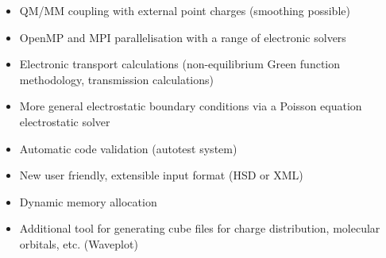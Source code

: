 \begin{itemize}
\item QM/MM coupling with external point charges (smoothing possible)
\item OpenMP and MPI parallelisation with a range of electronic solvers
\item Electronic transport calculations (non-equilibrium Green function
  methodology, transmission calculations)
\item More general electrostatic boundary conditions via a Poisson equation
  electrostatic solver
\item Automatic code validation (autotest system)
\item New user friendly, extensible input format (HSD or XML)
\item Dynamic memory allocation
\item Additional tool for generating cube files for charge distribution,
  molecular orbitals, etc. (Waveplot)
\end{itemize}
